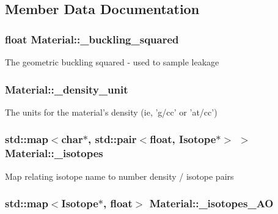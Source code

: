 \subsection{Member Data Documentation}
\hypertarget{classMaterial_a21f5e5ca63cd04c60095868d57baf3a4}{
\subsubsection[{\-\_\-buckling\-\_\-squared}]{\setlength{\rightskip}{0pt plus 5cm}float Material\-::\-\_\-buckling\-\_\-squared\hspace{0.3cm}{\ttfamily [private]}}}\label{classMaterial_a21f5e5ca63cd04c60095868d57baf3a4}
The geometric buckling squared -\/ used to sample leakage \hypertarget{classMaterial_ae21ca778e0138e02a3aa81a726dc8a94}{
\subsubsection[{\-\_\-density\-\_\-unit}]{ Material\-::\-\_\-density\-\_\-unit\hspace{0.3cm}{\ttfamily [private]}}}\label{classMaterial_ae21ca778e0138e02a3aa81a726dc8a94}
The units for the material's density (ie, 'g/cc' or 'at/cc') \hypertarget{classMaterial_a4d5279bd3412ccc933feca7b79488787}{
\subsubsection[{\-\_\-isotopes}]{\setlength{\rightskip}{0pt plus 5cm}std\-::map$<$char$\ast$, std\-::pair$<$float, {\bf Isotope}$\ast$$>$ $>$ Material\-::\-\_\-isotopes\hspace{0.3cm}{\ttfamily [private]}}}\label{classMaterial_a4d5279bd3412ccc933feca7b79488787}
Map relating isotope name to number density / isotope pairs \hypertarget{classMaterial_aba125e44b2b55657a2977e05fbfe879b}{
\subsubsection[{\-\_\-isotopes\-\_\-\-A\-O}]{\setlength{\rightskip}{0pt plus 5cm}std\-::map$<${\bf Isotope}$\ast$, float$>$ Material\-::\-\_\-isotopes\-\_\-\-A\-O\hspace{0.3cm}{\ttfamily [private]}}}\label{classMaterial_aba125e44b2b55657a2977e05fbfe879b}
